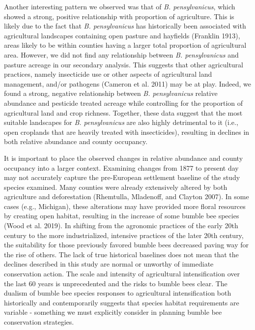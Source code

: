 \documentclass[11pt,]{article}
\begin{document}
Another interesting pattern we observed was that of \emph{B.
pensylvanicus}, which showed a strong, positive relationship with
proportion of agriculture. This is likely due to the fact that \emph{B.
pensylvanicus} has historically been associated with agricultural
landscapes containing open pasture and hayfields (Franklin 1913), areas
likely to be within counties having a larger total proportion of
agricultural area. However, we did not find any relationship between
\emph{B. pensylvanicus} and pasture acreage in our secondary analysis.
This suggests that other agricultural practices, namely insecticide use
or other aspects of agricultural land management, and/or pathogens
(Cameron et al. 2011) may be at play. Indeed, we found a strong,
negative relationship between \emph{B. pensylvanicus} relative abundance
and pesticide treated acreage while controlling for the proportion of
agricultural land and crop richness. Together, these data suggest that
the most suitable landscapes for \emph{B. pensylvanicus} are also highly
detrimental to it (i.e., open croplands that are heavily treated with
insecticides), resulting in declines in both relative abundance and
county occupancy.

It is important to place the observed changes in relative abundance and
county occupancy into a larger context. Examining changes from 1877 to
present day may not accurately capture the pre-European settlement
baseline of the study species examined. Many counties were already
extensively altered by both agriculture and deforestation (Rhemtulla,
Mladenoff, and Clayton 2007). In some cases (e.g., Michigan), these
alterations may have provided more floral resources by creating open
habitat, resulting in the increase of some bumble bee species (Wood et
al. 2019). In shifting from the agronomic practices of the early 20th
century to the more industrialized, intensive practices of the later
20th century, the suitability for those previously favored bumble bees
decreased paving way for the rise of others. The lack of true historical
baselines does not mean that the declines described in this study are
normal or unworthy of immediate conservation action. The scale and
intensity of agricultural intensification over the last 60 years is
unprecedented and the risks to bumble bees clear. The dualism of bumble
bee species responses to agricultural intensification both historically
and contemporarily suggests that species habitat requirements are
variable - something we must explicitly consider in planning bumble bee
conservation strategies.
\end{document}
